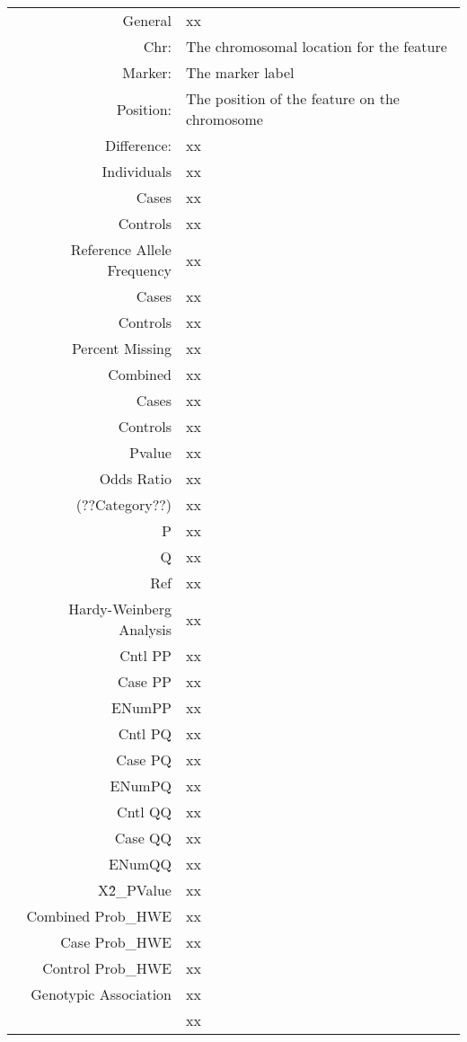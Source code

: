 \vspace{1em}
\begin{supertabular}{r p{5in}}
  General & xx ~ \\
    Chr: & The chromosomal location for the feature \\
    Marker: & The marker label \\
    Position: & The position of the feature on the chromosome \\
    Difference: & xx \\ [1em]
  Individuals & xx ~ \\
    Cases  & xx  \\
    Controls  & xx  \\ [1em]
  Reference Allele Frequency & xx \\
    Cases  & xx  \\
    Controls  & xx  \\ [1em]
  Percent Missing & xx  \\
    Combined  & xx  \\
    Cases  & xx  \\
    Controls  & xx  \\
    Pvalue  & xx  \\
    Odds Ratio  & xx  \\ [1em]
  (??Category??) & xx  \\
    P  & xx  \\
    Q  & xx  \\
    Ref  & xx  \\ [1em]
  Hardy-Weinberg Analysis & xx ~ \\ [1em]
    Cntl PP  & xx  \\
    Case PP  & xx  \\
    ENumPP  & xx  \\
    Cntl PQ  & xx  \\
    Case PQ  & xx  \\
    ENumPQ  & xx  \\
    Cntl QQ  & xx  \\
    Case QQ  & xx  \\
    ENumQQ  & xx  \\
    X\^2\_PValue  & xx  \\
    Combined Prob\_HWE  & xx  \\
    Case Prob\_HWE  & xx  \\
    Control Prob\_HWE  & xx  \\ [1em]
  Genotypic Association & xx ~ \\
  ~ & xx ~ \\

\end{supertabular}
